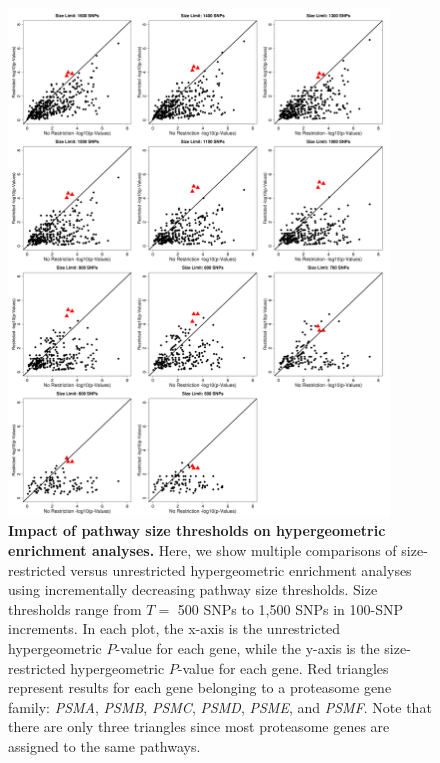 \documentclass[10pt]{article}
\begin{document}
\begin{figure}[H]
\label{InterPath-Supp-Figure-Prot-Heatplots-Pakistani}
\end{figure}
\clearpage


\begin{figure}[htbp]
\centering
\vspace*{-1cm}
\includegraphics[width=0.9\textwidth]{Images/Supp/InterPath_Supp_Figure_Hypergemeotric_SizeThresholds_vs1.png}
\caption{\textbf{Impact of pathway size thresholds on hypergeometric enrichment analyses.} 
Here, we show multiple comparisons of size-restricted versus unrestricted hypergeometric 
enrichment analyses using incrementally decreasing pathway size thresholds. Size thresholds 
range from $T =$ 500 SNPs to 1,500 SNPs in 100-SNP increments. In each plot, the x-axis is the 
unrestricted hypergeometric $P$-value for each gene, while the y-axis is the size-restricted 
hypergeometric $P$-value for each gene. Red triangles represent results for each gene belonging 
to a proteasome gene family: {\emph{PSMA}}, {\emph{PSMB}}, {\emph{PSMC}}, {\emph{PSMD}}, 
{\emph{PSME}}, and {\emph{PSMF}}. Note that there are only three triangles since most proteasome 
genes are assigned to the same pathways.}
\label{InterPath-Supp-Figure-Hypergeoemtric-SizeThresholds}
\end{figure}
\clearpage
\end{document}
